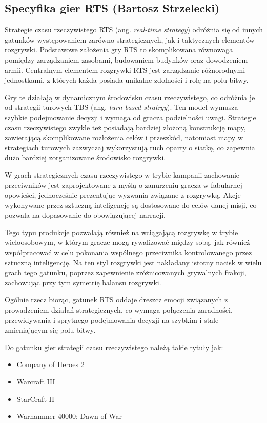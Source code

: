 \subsection{Specyfika gier RTS (Bartosz Strzelecki)}\label{ss:rts}

Strategie czasu rzeczywistego RTS (ang. \textit{real-time strategy}) odróżnia się od innych gatunków występowaniem zarówno strategicznych, jak i taktycznych
elementów rozgrywki. Podstawowe założenia gry RTS to skomplikowana równowaga pomiędzy zarządzaniem zasobami, budowaniem budynków oraz
dowodzeniem armii. Centralnym elementem rozgrywki RTS jest zarządzanie różnorodnymi jednostkami, z których każda posiada unikalne zdolności i rolę na polu bitwy.

Gry te działają w dynamicznym środowisku czasu rzeczywistego, co odróżnia je od strategii turowych TBS (ang.  \textit{turn-based stratrgy}). Ten model wymusza szybkie podejmowanie decyzji
i wymaga od gracza podzielności uwagi. Strategie czasu rzeczywistego zwykle też posiadają bardziej złożoną konstrukcję mapy, zawierającą skomplikowane
rozłożenia celów i przeszkód, natomiast mapy w strategiach turowych zazwyczaj wykorzystują ruch oparty o siatkę, co zapewnia dużo bardziej
zorganizowane środowisko rozgrywki.

W grach strategicznych czasu rzeczywistego w trybie kampanii zachowanie przeciwników jest zaprojektowane z myślą o zanurzeniu gracza w fabularnej opowieści, jednocześnie
prezentując wyzwania związane z rozgrywką. Akcje wykonywane przez sztuczną inteligencję są dostosowane do celów danej misji, co pozwala
na dopasowanie do obowiązującej narracji.

Tego typu produkcje pozwalają również na wciągającą rozgrywkę w trybie wieloosobowym, w którym gracze mogą rywalizować między sobą, jak również
współpracować w celu pokonania wspólnego przeciwnika kontrolowanego przez sztuczną inteligencję. Na ten styl rozgrywki jest nakładany istotny nacisk
w wielu grach tego gatunku, poprzez zapewnienie zróżnicowanych grywalnych frakcji, zachowując przy tym symetrię balansu rozgrywki.

Ogólnie rzecz biorąc, gatunek RTS oddaje dreszcz emocji związanych z prowadzeniem działań strategicznych, co wymaga połączenia zaradności,
przewidywania i sprytnego podejmowania decyzji na szybkim i stale zmieniającym się polu bitwy.

Do gatunku gier strategii czasu rzeczywistego należą takie tytuły jak:
\begin{itemize}
  \item Company of Heroes 2
  \item Warcraft III
  \item StarCraft II
  \item Warhammer 40000: Dawn of War
\end{itemize}
